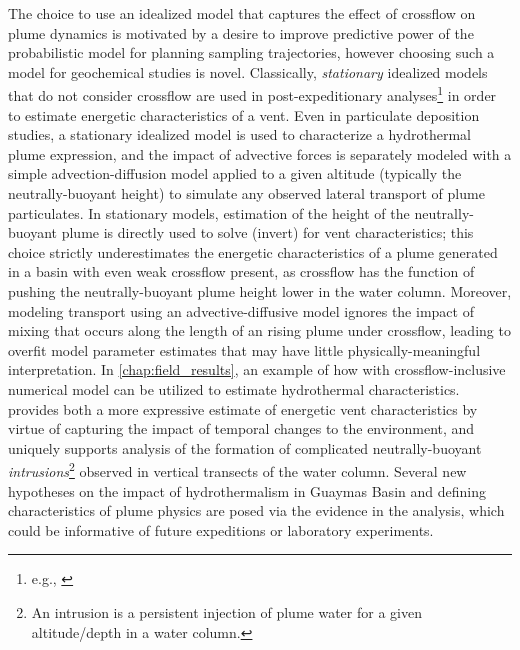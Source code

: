 The choice to use an idealized model that captures the effect of crossflow on plume dynamics is motivated by a desire to improve predictive power of the probabilistic model for planning sampling trajectories, however choosing such a model for geochemical studies is novel.
Classically, \emph{stationary} idealized models that do not consider crossflow are used in post-expeditionary analyses\footnote{e.g., \autocite{barreyre2012structure,mittelstaedt2012quantifying,murch2020volcaniclastic}} in order to estimate energetic characteristics of a vent.
Even in particulate deposition studies, a stationary idealized model is used to characterize a hydrothermal plume expression, and the impact of advective forces is separately modeled with a simple advection-diffusion model applied to a given altitude (typically the neutrally-buoyant height) to simulate any observed lateral transport of plume particulates.
In stationary models, estimation of the height of the neutrally-buoyant plume is directly used to solve (invert) for vent characteristics; this choice strictly underestimates the energetic characteristics of a plume generated in a basin with even weak crossflow present, as crossflow has the function of pushing the neutrally-buoyant plume height lower in the water column.
Moreover, modeling transport using an advective-diffusive model ignores the impact of mixing that occurs along the length of an rising plume under crossflow, leading to overfit model parameter estimates that may have little physically-meaningful interpretation.
In \cref{chap:field_results}, an example of how \PHUMES with crossflow-inclusive numerical model can be utilized to estimate hydrothermal characteristics.
\PHUMES provides both a more expressive estimate of energetic vent characteristics by virtue of capturing the impact of temporal changes to the environment, and uniquely supports analysis of the formation of complicated neutrally-buoyant \emph{intrusions}\footnote{An intrusion is a persistent injection of plume water for a given altitude/depth in a water column.} observed in vertical transects of the water column.
Several new hypotheses on the impact of hydrothermalism in Guaymas Basin and defining characteristics of plume physics are posed via the evidence in the analysis, which could be informative of future expeditions or laboratory experiments.


